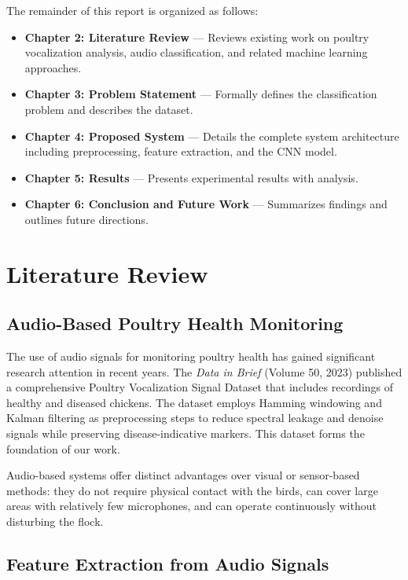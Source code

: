 \documentclass[12pt,a4paper]{report}
\begin{document}
The remainder of this report is organized as follows:
\begin{itemize}
    \item \textbf{Chapter 2: Literature Review} --- Reviews existing work on poultry vocalization analysis, audio classification, and related machine learning approaches.
    \item \textbf{Chapter 3: Problem Statement} --- Formally defines the classification problem and describes the dataset.
    \item \textbf{Chapter 4: Proposed System} --- Details the complete system architecture including preprocessing, feature extraction, and the CNN model.
    \item \textbf{Chapter 5: Results} --- Presents experimental results with analysis.
    \item \textbf{Chapter 6: Conclusion and Future Work} --- Summarizes findings and outlines future directions.
\end{itemize}


\chapter{Literature Review}
\label{ch:literature_review}

\section{Audio-Based Poultry Health Monitoring}

The use of audio signals for monitoring poultry health has gained significant research attention in recent years. The \textit{Data in Brief} (Volume 50, 2023) \cite{datainbrief2023} published a comprehensive Poultry Vocalization Signal Dataset that includes recordings of healthy and diseased chickens. The dataset employs Hamming windowing and Kalman filtering as preprocessing steps to reduce spectral leakage and denoise signals while preserving disease-indicative markers. This dataset forms the foundation of our work.

Audio-based systems offer distinct advantages over visual or sensor-based methods: they do not require physical contact with the birds, can cover large areas with relatively few microphones, and can operate continuously without disturbing the flock.

\section{Feature Extraction from Audio Signals}
\end{document}
